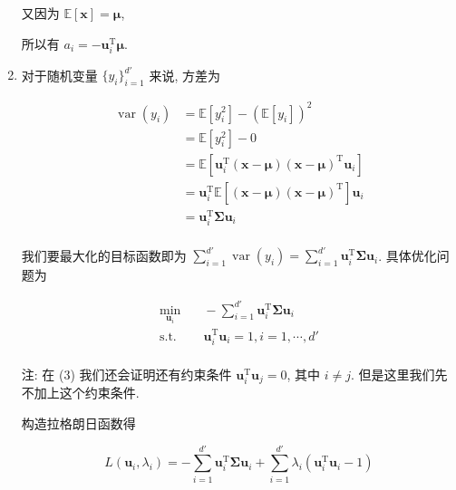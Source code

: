 \documentclass[answers]{exam}  %
\begin{document}
\begin{questions}
\begin{solution}
\begin{enumerate}
            又因为 $\mathbb{E}[\bm{x}] = \bm{\mu}$,

            所以有 $a_i = -\bm{u}_i^{\mathrm{T}}\bm{\mu}$.

      \item

            对于随机变量 $\{ y_i \}_{i=1}^{d'}$ 来说, 方差为

            $$
              \begin{aligned}
                \operatorname{var}(y_i) & = \mathbb{E}[y_i^{2}] - (\mathbb{E}[y_i])^{2}                                                  \\
                                        & = \mathbb{E}[y_i^{2}] - 0                                                                      \\
                                        & = \mathbb{E}[\bm{u}_i^{\mathrm{T}}(\bm{x} - \bm{\mu})(\bm{x} - \bm{\mu})^{\mathrm{T}}\bm{u}_i] \\
                                        & = \bm{u}_i^{\mathrm{T}}\mathbb{E}[(\bm{x} - \bm{\mu})(\bm{x} - \bm{\mu})^{\mathrm{T}}]\bm{u}_i \\
                                        & = \bm{u}_i^{\mathrm{T}}\bm{\Sigma}\bm{u}_i                                                     \\
              \end{aligned}
            $$

            我们要最大化的目标函数即为 $\displaystyle \sum_{i=1}^{d'}\operatorname{var}(y_i) = \sum_{i=1}^{d'}\bm{u}_i^{\mathrm{T}}\bm{\Sigma}\bm{u}_i$. 具体优化问题为

            $$
              \begin{aligned}
                \min_{\bm{u}_i} & \quad -\sum_{i=1}^{d'}\bm{u}_i^{\mathrm{T}}\bm{\Sigma}\bm{u}_i \\
                \text{s.t.}     & \quad \bm{u}_i^{\mathrm{T}}\bm{u}_i = 1, i = 1, \cdots, d'     \\
              \end{aligned}
            $$

            注: 在 (3) 我们还会证明还有约束条件 $\bm{u}_i^{\mathrm{T}}\bm{u}_j = 0$, 其中 $i \neq j$. 但是这里我们先不加上这个约束条件.

            构造拉格朗日函数得

            $$
              L(\bm{u}_i, \lambda_i) = -\sum_{i=1}^{d'}\bm{u}_i^{\mathrm{T}}\bm{\Sigma}\bm{u}_i + \sum_{i=1}^{d'}\lambda_i(\bm{u}_i^{\mathrm{T}}\bm{u}_i - 1)
            $$


\end{enumerate}
\end{solution}
\end{questions}
\end{document}
